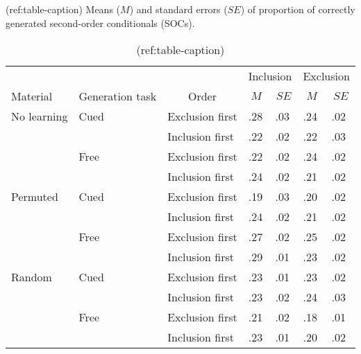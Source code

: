 \clearpage
\makeatletter
\efloat@restorefloats
\makeatother


\begin{appendix}
\section{}
(ref:table-caption) Means (\(M\)) and standard errors (\(\mathit{SE}\))
of proportion of correctly generated second-order conditionals (SOCs).

\begin{table}[h]

\begin{center}
\begin{threeparttable}

\caption{\label{tab:unnamed-chunk-2}(ref:table-caption)}

\begin{tabular}{lllllll}
\toprule
 &  &  & \multicolumn{2}{c}{Inclusion} & \multicolumn{2}{c}{Exclusion} \\
\cmidrule(r){4-5} \cmidrule(r){6-7}
Material & \multicolumn{1}{c}{Generation task} & \multicolumn{1}{c}{Order} & \multicolumn{1}{c}{$M$} & \multicolumn{1}{c}{$\mathit{SE}$} & \multicolumn{1}{c}{$M$} & \multicolumn{1}{c}{$\mathit{SE}$}\\
\midrule
No learning & Cued & Exclusion first & .28 & .03 & .24 & .02\\
 &  & Inclusion first & .22 & .02 & .22 & .03\\
 & Free & Exclusion first & .22 & .02 & .24 & .02\\
 &  & Inclusion first & .24 & .02 & .21 & .02\\ \midrule
Permuted & Cued & Exclusion first & .19 & .03 & .20 & .02\\
 &  & Inclusion first & .24 & .02 & .21 & .02\\
 & Free & Exclusion first & .27 & .02 & .25 & .02\\
 &  & Inclusion first & .29 & .01 & .23 & .02\\ \midrule
Random & Cued & Exclusion first & .23 & .01 & .23 & .02\\
 &  & Inclusion first & .23 & .02 & .24 & .03\\
 & Free & Exclusion first & .21 & .02 & .18 & .01\\
 &  & Inclusion first & .23 & .01 & .20 & .02\\ \midrule
\bottomrule
\end{tabular}

\end{threeparttable}
\end{center}

\end{table}
\end{appendix}
